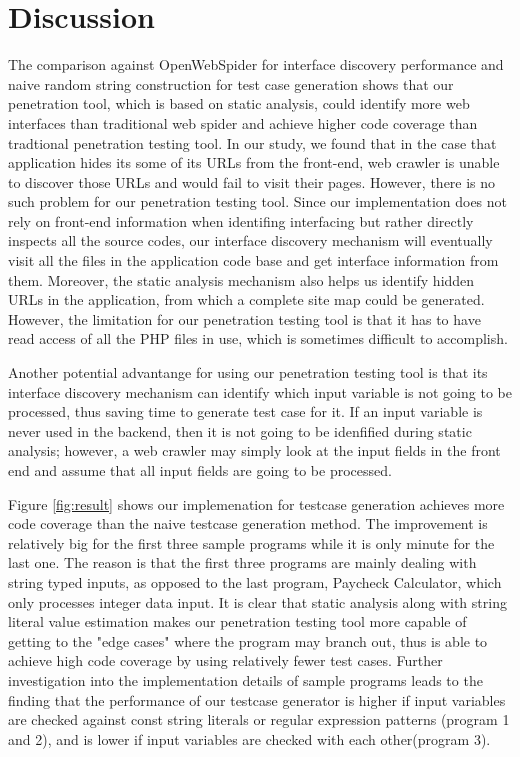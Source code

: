 \chapter{Discussion}

The comparison against OpenWebSpider for interface discovery performance and naive random string construction for test case generation shows that our penetration tool, which is based on static analysis, could identify more web interfaces than traditional web spider and achieve higher code coverage than tradtional penetration testing tool. In our study, we found that in the case that application hides its some of its URLs from the front-end, web crawler is unable to discover those URLs and would fail to visit their pages. However, there is no such problem for our penetration testing tool. Since our implementation does not rely on front-end information when identifing interfacing but rather directly inspects all the source codes, our interface discovery mechanism will eventually visit all the files in the application code base and get interface information from them. Moreover, the static analysis mechanism also helps us identify hidden URLs in the application, from which a complete site map could be generated. However, the limitation for our penetration testing tool is that it has to have read access of all the PHP files in use, which is sometimes difficult to accomplish.

Another potential advantange for using our penetration testing tool is that its interface discovery mechanism can identify which input variable is not going to be processed, thus saving time to generate test case for it. If an input variable is never used in the backend, then it is not going to be idenfified during static analysis; however, a web crawler may simply look at the input fields in the front end and assume that all input fields are going to be processed.

Figure \ref{fig:result} shows our implemenation for testcase generation achieves more code coverage than the naive testcase generation method. The improvement is relatively big for the first three sample programs while it is only minute for the last one. The reason is that the first three programs are mainly dealing with string typed inputs, as opposed to the last program, Paycheck Calculator, which only processes integer data input. It is clear that static analysis along with string literal value estimation makes our penetration testing tool more capable of getting to the "edge cases" where the program may branch out, thus is able to achieve high code coverage by using relatively fewer test cases. Further investigation into the implementation details of sample programs leads to the finding that the performance of our testcase generator is higher if input variables are checked against const  string literals or regular expression patterns (program 1 and 2), and is lower if input variables are checked with each other(program 3).